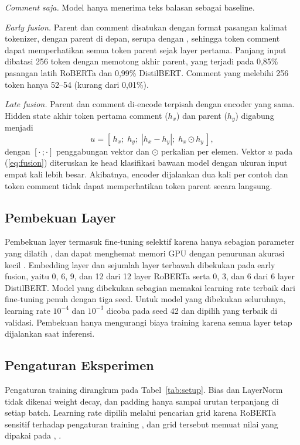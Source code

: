 \documentclass[conference]{IEEEtran}
\begin{document}
\textit{Comment saja.} Model hanya menerima teks balasan sebagai baseline.

\textit{Early fusion.} Parent dan comment disatukan dengan format pasangan kalimat tokenizer, dengan parent di depan, serupa dengan \cite{ataeii2020transformers}, sehingga token comment dapat memperhatikan semua token parent sejak layer pertama. Panjang input dibatasi 256 token dengan memotong akhir parent, yang terjadi pada 0,85\% pasangan latih RoBERTa dan 0,99\% DistilBERT. Comment yang melebihi 256 token hanya 52--54 (kurang dari 0,01\%).

\textit{Late fusion.} Parent dan comment di-encode terpisah dengan encoder yang sama. Hidden state akhir token pertama comment ($h_x$) dan parent ($h_y$) digabung menjadi
\begin{equation}
u = [\,h_x;\; h_y;\; |h_x - h_y|;\; h_x \odot h_y\,],
\label{eq:fusion}
\end{equation}
dengan $[\cdot\,;\cdot]$ penggabungan vektor dan $\odot$ perkalian per elemen. Vektor $u$ pada (\ref{eq:fusion}) diteruskan ke head klasifikasi bawaan model dengan ukuran input empat kali lebih besar. Akibatnya, encoder dijalankan dua kali per contoh dan token comment tidak dapat memperhatikan token parent secara langsung.

\subsection{Pembekuan Layer}
Pembekuan layer termasuk fine-tuning selektif karena hanya sebagian parameter yang dilatih \cite{han2024peft}, dan dapat menghemat memori GPU dengan penurunan akurasi kecil \cite{ardakani2024slimfit}. Embedding layer dan sejumlah layer terbawah dibekukan pada early fusion, yaitu 0, 6, 9, dan 12 dari 12 layer RoBERTa serta 0, 3, dan 6 dari 6 layer DistilBERT. Model yang dibekukan sebagian memakai learning rate terbaik dari fine-tuning penuh dengan tiga seed. Untuk model yang dibekukan seluruhnya, learning rate $10^{-4}$ dan $10^{-3}$ dicoba pada seed 42 dan dipilih yang terbaik di validasi. Pembekuan hanya mengurangi biaya training karena semua layer tetap dijalankan saat inferensi.

\subsection{Pengaturan Eksperimen}
Pengaturan training dirangkum pada Tabel~\ref{tab:setup}. Bias dan LayerNorm tidak dikenai weight decay, dan padding hanya sampai urutan terpanjang di setiap batch. Learning rate dipilih melalui pencarian grid karena RoBERTa sensitif terhadap pengaturan training \cite{jimenez2026bert}, dan grid tersebut memuat nilai yang dipakai pada \cite{dubey2026efficient}, \cite{ullah2026advanced}.
\end{document}
